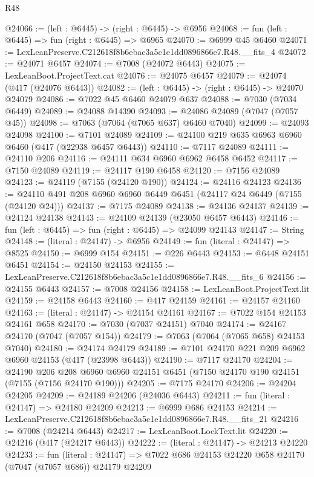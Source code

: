 \begin{lexlean}{R48}
\begin{coremodule}
@24066 := (left : @6445) -> (right : @6445) -> @6956
@24068 := fun (left : @6445) => fun (right : @6445) => @6965
@24070 := @6999 @45 @6460
@24071 := LexLeanPreserve.C212618f8b6ebac3a5c1e1dd0896866e7.R48.__fits_4
@24072 := @24071 @6457
@24074 := @7008 (@24072 @6443)
@24075 := LexLeanBoot.ProjectText.cat
@24076 := @24075 @6457
@24079 := @24074 (@417 (@24076 @6443))
@24082 := (left : @6445) -> (right : @6445) -> @24070 @24079
@24086 := @7022 @45 @6460 @24079 @637
@24088 := @7030 (@7034 @6449)
@24089 := @24088 @14390
@24093 := @24086 @24089 (@7047 (@7057 @45))
@24098 := @7063 (@7064 (@7065 @637) @6460 @7040)
@24099 := @24093 @24098
@24100 := @7101 @24089
@24109 := @24100 @219 @635 @6963 @6960 @6460 (@417 (@22938 @6457 @6443))
@24110 := @7117 @24089
@24111 := @24110 @206
@24116 := @24111 @634 @6960 @6962 @6458 @6452
@24117 := @7150 @24089
@24119 := @24117 @190 @6458
@24120 := @7156 @24089
@24123 := @24119 (@7155 (@24120 @190))
@24124 := @24116 @24123
@24136 := @24110 @491 @208 @6960 @6960 @6449 @6451 (@24117 @24 @6449 (@7155 (@24120 @24)))
@24137 := @7175 @24089
@24138 := @24136 @24137
@24139 := @24124 @24138
@24143 := @24109 @24139 (@23050 @6457 @6443)
@24146 := fun (left : @6445) => fun (right : @6445) => @24099 @24143
@24147 := String
@24148 := (literal : @24147) -> @6956
@24149 := fun (literal : @24147) => @8525
@24150 := @6999 @154
@24151 := @226 @6443
@24153 := @6448 @24151 @6451
@24154 := @24150 @24153
@24155 := LexLeanPreserve.C212618f8b6ebac3a5c1e1dd0896866e7.R48.__fits_6
@24156 := @24155 @6443
@24157 := @7008 @24156
@24158 := LexLeanBoot.ProjectText.lit
@24159 := @24158 @6443
@24160 := @417 @24159
@24161 := @24157 @24160
@24163 := (literal : @24147) -> @24154 @24161
@24167 := @7022 @154 @24153 @24161 @658
@24170 := @7030 (@7037 @24151) @7040
@24174 := @24167 @24170 (@7047 (@7057 @154))
@24179 := @7063 (@7064 (@7065 @658) @24153 @7040)
@24180 := @24174 @24179
@24189 := @7101 @24170 @221 @209 @6962 @6960 @24153 (@417 (@23998 @6443))
@24190 := @7117 @24170
@24204 := @24190
    @206
    @208
    @6960
    @6960
    @24151
    @6451
    (@7150 @24170 @190 @24151 (@7155 (@7156 @24170 @190)))
@24205 := @7175 @24170
@24206 := @24204 @24205
@24209 := @24189 @24206 (@24036 @6443)
@24211 := fun (literal : @24147) => @24180 @24209
@24213 := @6999 @686 @24153
@24214 := LexLeanPreserve.C212618f8b6ebac3a5c1e1dd0896866e7.R48.__fits_21
@24216 := @7008 (@24214 @6443)
@24217 := LexLeanBoot.LockText.lit
@24220 := @24216 (@417 (@24217 @6443))
@24222 := (literal : @24147) -> @24213 @24220
@24233 := fun (literal : @24147) =>
  @7022 @686 @24153 @24220 @658 @24170 (@7047 (@7057 @686)) @24179 @24209

\end{coremodule}
\end{lexlean}
